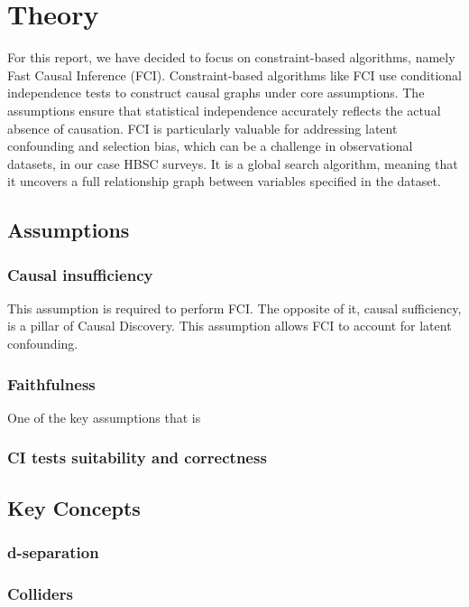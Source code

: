 \documentclass[main.tex]{subfiles}
\begin{document}
\section{Theory}
For this report, we have decided to focus on constraint-based algorithms, namely Fast Causal Inference (FCI). Constraint-based algorithms like FCI use conditional independence tests to construct causal graphs under core assumptions. The assumptions ensure that statistical independence accurately reflects the actual absence of causation. FCI is particularly valuable for addressing latent confounding and selection bias, which can be a challenge in observational datasets, in our case HBSC surveys. It is a global search algorithm, meaning that it uncovers a full relationship graph between variables specified in the dataset. 
\subsection{Assumptions}
\subsubsection*{Causal insufficiency}
This assumption is required to perform FCI. The opposite of it, causal sufficiency, is a pillar of Causal Discovery. This assumption allows FCI to account for latent confounding. 
\subsubsection*{Faithfulness}
One of the key assumptions that is 

\subsubsection*{CI tests suitability and correctness}

\subsection{Key Concepts}

\subsubsection{d-separation}

\subsubsection{Colliders}
\end{document}
